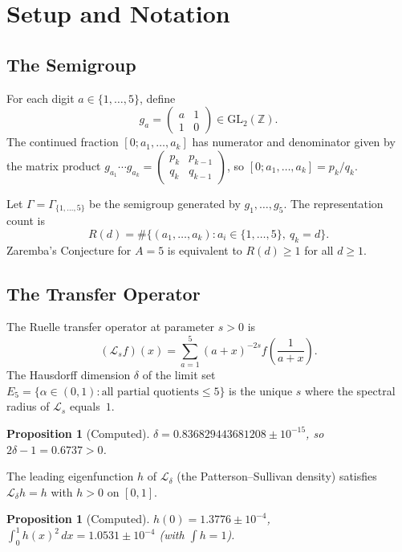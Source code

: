 \documentclass[11pt,a4paper]{amsart}
\newtheorem{proposition}[theorem]{Proposition}
\theoremstyle{definition}
\begin{document}
\section{Setup and Notation}

\subsection{The Semigroup}

For each digit $a \in \{1,\ldots,5\}$, define
\[
g_a = \begin{pmatrix} a & 1 \\ 1 & 0 \end{pmatrix} \in \mathrm{GL}_2(\mathbb{Z}).
\]
The continued fraction $[0; a_1, \ldots, a_k]$ has numerator and denominator given by the matrix product $g_{a_1} \cdots g_{a_k} = \begin{pmatrix} p_k & p_{k-1} \\ q_k & q_{k-1} \end{pmatrix}$, so $[0; a_1, \ldots, a_k] = p_k / q_k$.

Let $\Gamma = \Gamma_{\{1,\ldots,5\}}$ be the semigroup generated by $g_1, \ldots, g_5$. The representation count is
\[
R(d) = \#\{(a_1, \ldots, a_k) : a_i \in \{1,\ldots,5\},\ q_k = d\}.
\]
Zaremba's Conjecture for $A=5$ is equivalent to $R(d) \geq 1$ for all $d \geq 1$.

\subsection{The Transfer Operator}

The Ruelle transfer operator at parameter $s > 0$ is
\[
(\mathcal{L}_s f)(x) = \sum_{a=1}^{5} (a+x)^{-2s} f\!\left(\frac{1}{a+x}\right).
\]
The Hausdorff dimension $\delta$ of the limit set $E_5 = \{\alpha \in (0,1) : \text{all partial quotients} \leq 5\}$ is the unique $s$ where the spectral radius of $\mathcal{L}_s$ equals~$1$.

\begin{proposition}[Computed]\label{prop:delta}
$\delta = 0.836829443681208 \pm 10^{-15}$, so $2\delta - 1 = 0.6737 > 0$.
\end{proposition}

The leading eigenfunction $h$ of $\mathcal{L}_\delta$ (the Patterson--Sullivan density) satisfies $\mathcal{L}_\delta h = h$ with $h > 0$ on $[0,1]$.

\begin{proposition}[Computed]\label{prop:eigenfunction}
$h(0) = 1.3776 \pm 10^{-4}$, $\int_0^1 h(x)^2\,dx = 1.0531 \pm 10^{-4}$ (with $\int h = 1$).
\end{proposition}
\end{document}
